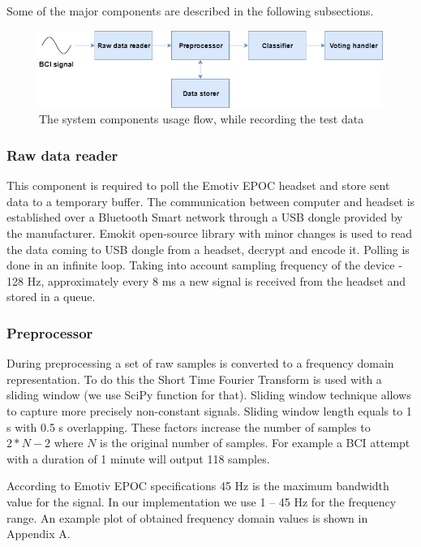 \documentclass[12pt]{article}
\theoremstyle{definition}
\begin{document}
Some of the major components are described in the following subsections.
\begin{figure} [ht]
\begin{center}
\includegraphics[width=1\textwidth]{maga_application}
\caption{The system components usage flow, while recording the test data}
\end{center}
\end{figure}

\subsubsection{Raw data reader}

This component is required to poll the Emotiv EPOC headset and store sent data to a temporary buffer. The communication between computer and headset is established over a Bluetooth Smart network through a USB dongle provided by the manufacturer. Emokit \cite{emokit} open-source library with minor changes is used to read the data coming to USB dongle from a headset, decrypt and encode it. Polling is done in an infinite loop. Taking into account sampling frequency of the device - 128 Hz, approximately every 8 ms a new signal is received from the headset and stored in a queue.

\subsubsection{Preprocessor}

During preprocessing a set of raw samples is converted to a frequency domain representation. To do this the Short Time Fourier Transform is used with a sliding window (we use SciPy \cite{scipy} function for that). Sliding window technique allows to capture more precisely non-constant signals. Sliding window length equals to 1 s with 0.5 s overlapping. These factors increase the number of samples to $2*N-2$ where $N$ is the original number of samples. For example a BCI attempt with a duration of 1 minute will output 118 samples.

According to Emotiv EPOC specifications \cite{emotiv} 45 Hz is the maximum bandwidth value for the signal. In our implementation we use 1 -- 45 Hz for the frequency range. An example plot of obtained frequency domain values is shown in Appendix A.
\end{document}
